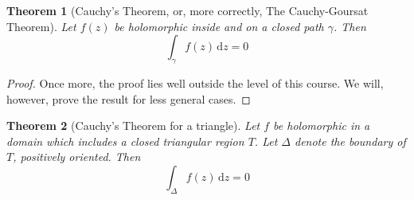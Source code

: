 \documentclass[10pt,fleqn]{article}
\newcommand{\diff}{\,\mathrm{d}}
\theoremstyle{definition} \newtheorem{defn}{Definition}[section]
\theoremstyle{plain}      \newtheorem{thm}[defn]{Theorem}
\theoremstyle{definition} \newtheorem{prop}[defn]{Proposition}
\theoremstyle{plain}      \newtheorem{lem}[defn]{Lemma}
\theoremstyle{definition} \newtheorem{cor}[defn]{Corollary}
\theoremstyle{definition} \newtheorem{ex}[defn]{Example}
\theoremstyle{definition} \newtheorem{rem}[defn]{Remark}
\begin{document}
\begin{thm}[Cauchy's Theorem, or, more correctly, The Cauchy-Goursat Theorem]
    Let $f(z)$ be holomorphic inside and on a closed path $\gamma$.
    Then
    \begin{equation}
        \int_{\gamma} f(z)\diff z
        =0
    \end{equation}
\end{thm}

\begin{proof}
    Once more, the proof lies well outside the level of this course.
    We will, however, prove the result for less general cases.
\end{proof}

\begin{thm}[Cauchy's Theorem for a triangle]
    Let $f$ be holomorphic in a domain which includes a closed triangular region $T$.
    Let $\Delta$ denote the boundary of $T$, positively oriented.
    Then
    \begin{equation}
        \int_{\Delta} f(z)\diff z
        =0
    \end{equation}
\end{thm}
\end{document}
